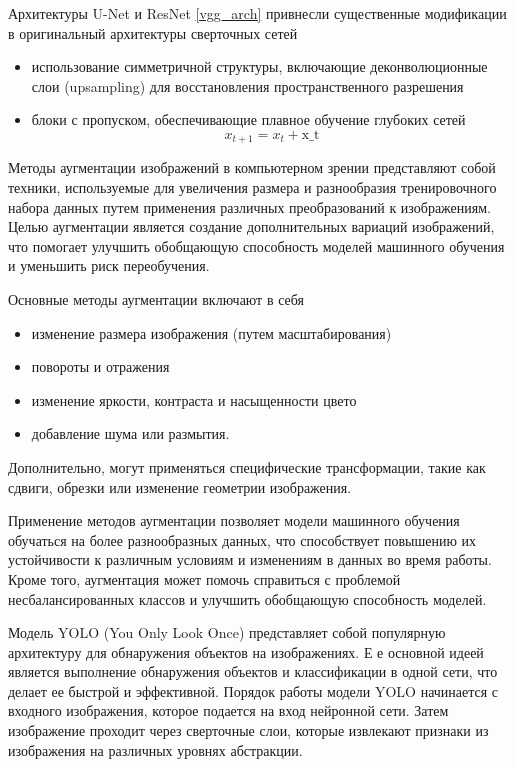 Архитектуры U-Net  и ResNet \ref{vgg_arch} привнесли 
существенные модификации в оригинальный архитектуры сверточных сетей \begin{itemize}
    \item использование симметричной структуры, 
    включающие деконволюционные слои (upsampling) для восстановления пространственного разрешения
    \item блоки с пропуском, обеспечивающие плавное обучение глубоких сетей
    \begin{equation}
        x_{t+1} = x_t + \text{x_t}
    \end{equation}
\end{itemize}

Методы аугментации изображений в компьютерном зрении представляют собой техники,
используемые для увеличения размера и разнообразия тренировочного набора данных путем применения различных преобразований к изображениям. 
Целью аугментации является создание дополнительных вариаций изображений, что помогает улучшить обобщающую способность моделей машинного обучения и уменьшить риск переобучения.

Основные методы аугментации включают в себя
\begin{itemize}
    \item изменение размера изображения (путем масштабирования)
    \item  повороты и отражения 
    \item  изменение яркости, контраста и насыщенности цвето
    \item добавление шума или размытия.
\end{itemize}    
    
Дополнительно, могут применяться специфические трансформации, такие как сдвиги, обрезки или изменение геометрии изображения.

Применение методов аугментации позволяет модели машинного обучения обучаться на более разнообразных данных, 
что способствует повышению их устойчивости к различным условиям и изменениям в данных во время работы.
Кроме того, аугментация может помочь справиться с проблемой несбалансированных классов и улучшить обобщающую способность моделей.

Модель YOLO (You Only Look Once) представляет собой популярную архитектуру для обнаружения объектов на изображениях. Е
е основной идеей является выполнение обнаружения объектов и классификации в одной сети, что делает ее быстрой и эффективной.
\cite{kirillov2023segment}
Порядок работы модели YOLO начинается с входного изображения, которое подается на вход нейронной сети. Затем изображение проходит через сверточные слои, которые извлекают признаки из изображения на различных уровнях абстракции.


